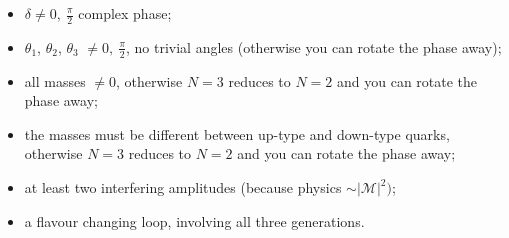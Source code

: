 \begin{itemize}
\item $\delta \neq 0,\ \frac{\pi}{2}$ complex phase;
\item $\theta_1$, $\theta_2$, $\theta_3$ $\neq 0,\ \frac{\pi}{2}$, no trivial angles (otherwise you can rotate the phase away);
\item all masses $\neq 0$, otherwise $N=3$ reduces to $N=2$ and you can rotate the phase away;
\item the masses must be different between up-type and down-type quarks, otherwise $N=3$ reduces to $N=2$ and you can rotate the phase away;
\item at least two interfering amplitudes (because physics $\sim |\mathcal{M}|^2)$;
\item a flavour changing loop, involving all three generations.
\end{itemize}
%
